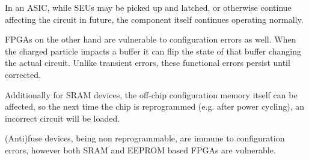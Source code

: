 \documentclass[12pt,drafta4paper,oneside]{memoir} %
\begin{document}
\begin{table}
    
    \label{ASICVFPGA}
\end{table}
In an \ac{ASIC}, while \acp{SEU} may be picked up and latched, or otherwise continue affecting the circuit in future, the component itself continues operating normally.

\acp{FPGA} on the other hand are vulnerable to configuration errors as well. When the charged particle impacts a buffer it can flip the state of that buffer changing the actual circuit. Unlike transient errors, these functional errors persist until corrected.

Additionally for \ac{SRAM} devices, the off-chip configuration memory itself can be affected, so the next time the chip is reprogrammed (e.g. after power cycling), an incorrect circuit will be loaded.

(Anti)fuse devices, being non reprogrammable, are immune to configuration errors, however both \ac{SRAM} and \ac{EEPROM} based \acp{FPGA} are vulnerable\cite{HFPP}.
\end{document}
